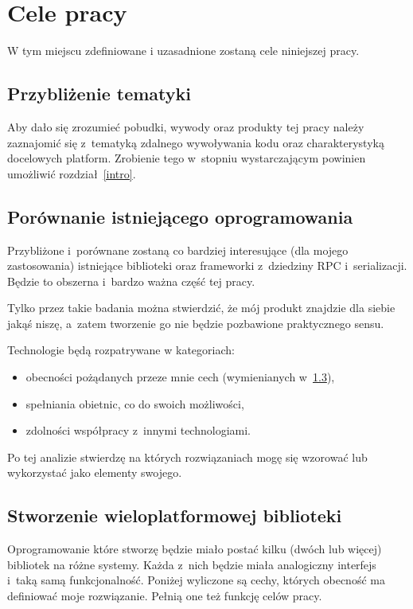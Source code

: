 \section{Cele pracy}
W tym miejscu zdefiniowane i uzasadnione zostaną cele niniejszej pracy.


\subsection{Przybliżenie tematyki}
Aby dało się zrozumieć pobudki, wywody oraz produkty tej pracy należy zaznajomić się z~tematyką zdalnego wywoływania kodu oraz charakterystyką docelowych platform. Zrobienie tego w~stopniu wystarczającym powinien umożliwić rozdział~\ref{intro}.

\subsection{Porównanie istniejącego oprogramowania}
Przybliżone i~porównane zostaną co bardziej interesujące (dla mojego zastosowania) istniejące biblioteki oraz frameworki z~dziedziny RPC i~serializacji. Będzie to obszerna i~bardzo ważna część tej pracy.

Tylko przez takie badania można stwierdzić, że mój produkt znajdzie dla siebie jakąś niszę, a~zatem tworzenie go nie będzie pozbawione praktycznego sensu.

Technologie będą rozpatrywane w kategoriach:
\begin{itemize}
	\item obecności pożądanych przeze mnie cech (wymienianych w~\ref{lib-requirements}),
	\item spełniania obietnic, co do swoich możliwości,
	\item zdolności współpracy z~innymi technologiami.
\end{itemize}

Po tej analizie stwierdzę na których rozwiązaniach mogę się wzorować lub wykorzystać jako elementy swojego.

\subsection{Stworzenie wieloplatformowej biblioteki}
\label{lib-requirements}
Oprogramowanie które stworzę będzie miało postać kilku (dwóch lub więcej) bibliotek na różne systemy. Każda z~nich będzie miała analogiczny interfejs i~taką samą funkcjonalność. Poniżej wyliczone są cechy, których obecność ma definiować moje rozwiązanie. Pełnią one też funkcję celów pracy.

